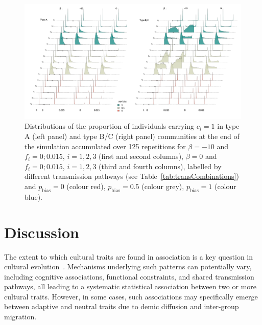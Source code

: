 \documentclass[9pt,twocolumn,twoside,lineno]{pnas-new}
\begin{document}
\begin{figure}
\includegraphics[width=17.0cm]{Figs/Figure4.pdf}
\caption{Distributions of the proportion of individuals carrying $c_i=1$ in type A (left panel) and type B/C (right panel) communities at the end of the simulation accumulated over 125 repetitions for $\beta=-10$ and $f_i=0;0.015$, $i=1,2,3$ (first and second columns), $\beta=0$ and $f_i=0;0.015$, $i=1,2,3$ (third and fourth columns), labelled by different transmission pathways (see Table~\ref{tab:transCombinations}) and $p_\text{bias}=0$ (colour red), $p_\text{bias}=0.5$ (colour grey), $p_\text{bias}=1$ (colour blue).} \label{fig:distributionsCommunityComposition_rho0}       
\end{figure}



\section*{Discussion}



The extent to which cultural traits are found in association is a key question in cultural evolution~\citep{boyd_are_1997,shennan_isolation-by-distance_2015,yeh_cultural_2019}. 
Mechanisms underlying such patterns can potentially vary, including cognitive associations, functional constraints, and shared transmission pathways, all leading to a systematic statistical association between two or more cultural traits. 
However, in some cases, such associations may specifically emerge between adaptive and neutral traits due to demic diffusion and inter-group migration.
\end{document}

